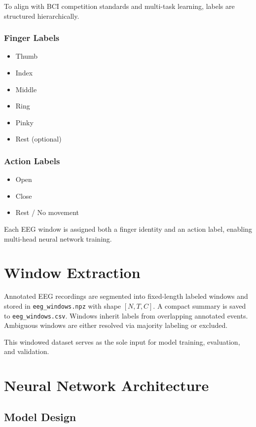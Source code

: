 \documentclass[11pt]{article}
\begin{document}
To align with BCI competition standards and multi-task learning, labels are structured hierarchically.

\subsubsection{Finger Labels}
\begin{itemize}
    \item Thumb
    \item Index
    \item Middle
    \item Ring
    \item Pinky
    \item Rest (optional)
\end{itemize}

\subsubsection{Action Labels}
\begin{itemize}
    \item Open
    \item Close
    \item Rest / No movement
\end{itemize}

Each EEG window is assigned both a finger identity and an action label, enabling multi-head neural network training.

\section{Window Extraction}

Annotated EEG recordings are segmented into fixed-length labeled windows and stored in \texttt{eeg\_windows.npz} with shape $[N, T, C]$. A compact summary is saved to \texttt{eeg\_\allowbreak windows.csv}. Windows inherit labels from overlapping annotated events. Ambiguous windows are either resolved via majority labeling or excluded.

This windowed dataset serves as the sole input for model training, evaluation, and validation.

\section{Neural Network Architecture}

\subsection{Model Design}
\end{document}
